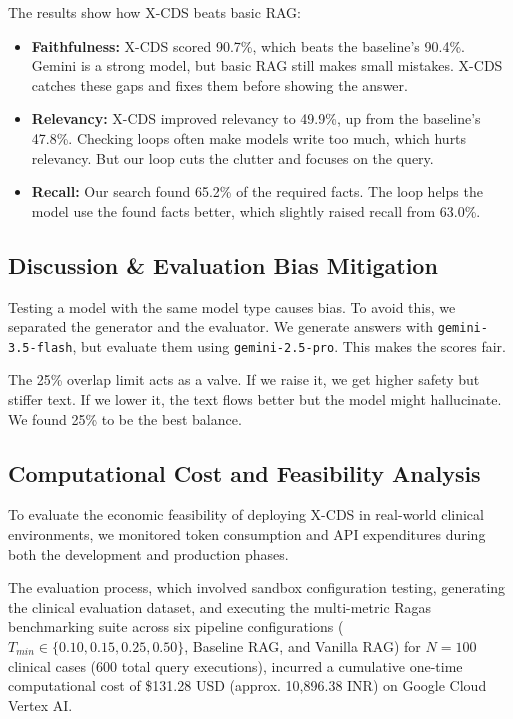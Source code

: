 \documentclass[pdflatex,sn-mathphys-num]{sn-jnl}%
\theoremstyle{thmstyleone}%
\theoremstyle{thmstyletwo}%
\theoremstyle{thmstylethree}%
\begin{document}
The results show how X-CDS beats basic RAG:
\begin{itemize}
    \item \textbf{Faithfulness:} X-CDS scored 90.7\%, which beats the baseline's 90.4\%. Gemini is a strong model, but basic RAG still makes small mistakes. X-CDS catches these gaps and fixes them before showing the answer.
    \item \textbf{Relevancy:} X-CDS improved relevancy to 49.9\%, up from the baseline's 47.8\%. Checking loops often make models write too much, which hurts relevancy. But our loop cuts the clutter and focuses on the query.
    \item \textbf{Recall:} Our search found 65.2\% of the required facts. The loop helps the model use the found facts better, which slightly raised recall from 63.0\%.
\end{itemize}

\subsection{Discussion \& Evaluation Bias Mitigation}
Testing a model with the same model type causes bias. To avoid this, we separated the generator and the evaluator. We generate answers with \texttt{gemini-3.5-flash}, but evaluate them using \texttt{gemini-2.5-pro}. This makes the scores fair.

The 25\% overlap limit acts as a valve. If we raise it, we get higher safety but stiffer text. If we lower it, the text flows better but the model might hallucinate. We found 25\% to be the best balance.

\subsection{Computational Cost and Feasibility Analysis}\label{subsec:cost}
To evaluate the economic feasibility of deploying X-CDS in real-world clinical environments, we monitored token consumption and API expenditures during both the development and production phases. 

The evaluation process, which involved sandbox configuration testing, generating the clinical evaluation dataset, and executing the multi-metric Ragas benchmarking suite across six pipeline configurations ($T_{min} \in \{0.10, 0.15, 0.25, 0.50\}$, Baseline RAG, and Vanilla RAG) for $N=100$ clinical cases (600 total query executions), incurred a cumulative one-time computational cost of \$131.28 USD (approx. 10,896.38 INR) on Google Cloud Vertex AI.
\end{document}
